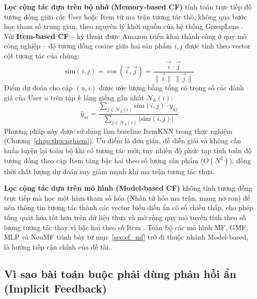 \textbf{Lọc cộng tác dựa trên bộ nhớ (Memory-based CF)} tính toán trực tiếp độ tương đồng giữa các User hoặc Item từ ma trận tương tác thô, không qua bước học tham số trung gian, theo nguyên lý khởi nguồn của hệ thống GroupLens \parencite{resnick1994grouplens}. Với \textbf{Item-based CF} \parencite{sarwar2001item} -- kỹ thuật được Amazon triển khai thành công ở quy mô công nghiệp \parencite{linden2003amazon} -- độ tương đồng cosine giữa hai sản phẩm $i, j$ được tính theo vector cột tương tác của chúng:
\begin{equation}
    \text{sim}(i, j) = \cos(\vec{i}, \vec{j}) = \frac{\vec{i} \cdot \vec{j}}{\lVert \vec{i} \rVert \, \lVert \vec{j} \rVert}
    \label{eq:cosine_sim}
\end{equation}
Điểm dự đoán cho cặp $(u, i)$ được ước lượng bằng tổng có trọng số các đánh giá của User $u$ trên tập $k$ láng giềng gần nhất $\mathcal{N}_k(i)$:
\begin{equation}
    \hat{y}_{ui} = \frac{\sum_{j \in \mathcal{N}_k(i)} \text{sim}(i, j) \cdot y_{uj}}{\sum_{j \in \mathcal{N}_k(i)} |\text{sim}(i, j)|}
    \label{eq:itemcf_predict}
\end{equation}
Phương pháp này được sử dụng làm baseline ItemKNN trong thực nghiệm (Chương~\ref{chap:thucnghiem}). Ưu điểm là đơn giản, dễ diễn giải và không cần huấn luyện lại toàn bộ khi có tương tác mới; tuy nhiên độ phức tạp tính toán độ tương đồng theo cặp Item tăng bậc hai theo số lượng sản phẩm ($O(N^2)$), đồng thời chất lượng dự đoán suy giảm mạnh khi ma trận tương tác thưa.

\textbf{Lọc cộng tác dựa trên mô hình (Model-based CF)} không tính tương đồng trực tiếp mà học một hàm tham số hóa (Nhân tử hóa ma trận, mạng nơ-ron) để nén thông tin tương tác thành các vector biểu diễn ẩn có số chiều thấp, cho phép tổng quát hóa tốt hơn trên dữ liệu thưa và mở rộng quy mô tuyến tính theo số lượng tương tác thay vì bậc hai theo số Item \parencite{koren2009matrix, su2009survey}. Toàn bộ các mô hình MF, GMF, MLP và NeuMF trình bày từ mục~\ref{sec:cf_mf} trở đi thuộc nhánh Model-based, là hướng tiếp cận chính của đề tài.

\subsection{Vì sao bài toán buộc phải dùng phản hồi ẩn (Implicit Feedback)}
\label{subsec:feedback_types}

